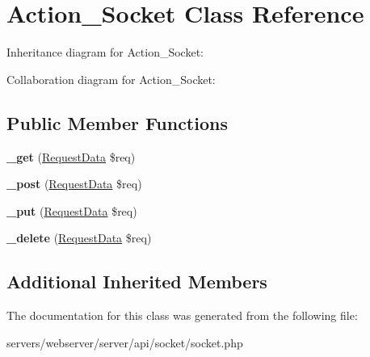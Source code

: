 \hypertarget{class_lora_1_1_api_1_1_action___socket}{}\section{Action\+\_\+\+Socket Class Reference}
\label{class_lora_1_1_api_1_1_action___socket}


Inheritance diagram for Action\+\_\+\+Socket\+:


Collaboration diagram for Action\+\_\+\+Socket\+:
\subsection*{Public Member Functions}
\begin{DoxyCompactItemize}
\item 
\mbox{\label{class_lora_1_1_api_1_1_action___socket_a3ad4bf1b146a3180b34d1327ff2abf69}} 
{\bfseries \+\_\+get} (\hyperlink{class_request_data}{Request\+Data} \$req)
\item 
\mbox{\label{class_lora_1_1_api_1_1_action___socket_a50751d47a139282d1c3b08cab1b6562e}} 
{\bfseries \+\_\+post} (\hyperlink{class_request_data}{Request\+Data} \$req)
\item 
\mbox{\label{class_lora_1_1_api_1_1_action___socket_a2affcc8f31c13147c33450193b229194}} 
{\bfseries \+\_\+put} (\hyperlink{class_request_data}{Request\+Data} \$req)
\item 
\mbox{\label{class_lora_1_1_api_1_1_action___socket_ab8ddc6de1e04524212f7d55893f78864}} 
{\bfseries \+\_\+delete} (\hyperlink{class_request_data}{Request\+Data} \$req)
\end{DoxyCompactItemize}
\subsection*{Additional Inherited Members}


The documentation for this class was generated from the following file\+:\begin{DoxyCompactItemize}
\item 
servers/webserver/server/api/socket/socket.\+php\end{DoxyCompactItemize}
